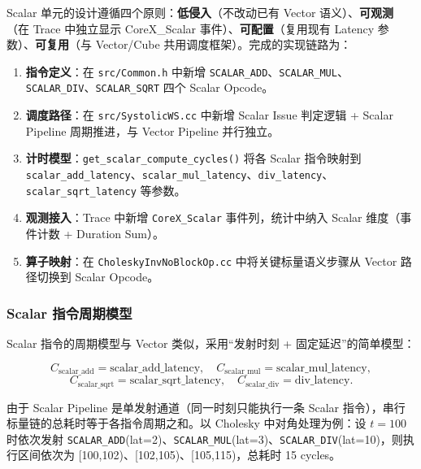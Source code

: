 \documentclass{CjC}
\begin{document}
Scalar 单元的设计遵循四个原则：\textbf{低侵入}（不改动已有 Vector 语义）、\textbf{可观测}（在 Trace 中独立显示 CoreX\_Scalar 事件）、\textbf{可配置}（复用现有 Latency 参数）、\textbf{可复用}（与 Vector/Cube 共用调度框架）。完成的实现链路为：

\begin{enumerate}
    \item \textbf{指令定义}：在 \texttt{src/Common.h} 中新增 \texttt{SCALAR\_ADD}、\texttt{SCALAR\_MUL}、\texttt{SCALAR\_DIV}、\texttt{SCALAR\_SQRT} 四个 Scalar Opcode。
    \item \textbf{调度路径}：在 \texttt{src/SystolicWS.cc} 中新增 Scalar Issue 判定逻辑 + Scalar Pipeline 周期推进，与 Vector Pipeline 并行独立。
    \item \textbf{计时模型}：\texttt{get\_scalar\_compute\_cycles()} 将各 Scalar 指令映射到 \texttt{scalar\_add\_latency}、\texttt{scalar\_mul\_latency}、\texttt{div\_latency}、\texttt{scalar\_sqrt\_latency} 等参数。
    \item \textbf{观测接入}：Trace 中新增 \texttt{CoreX\_Scalar} 事件列，统计中纳入 Scalar 维度（事件计数 + Duration Sum）。
    \item \textbf{算子映射}：在 \texttt{CholeskyInvNoBlockOp.cc} 中将关键标量语义步骤从 Vector 路径切换到 Scalar Opcode。
\end{enumerate}

\subsubsection{Scalar 指令周期模型}

Scalar 指令的周期模型与 Vector 类似，采用“发射时刻 + 固定延迟”的简单模型：

\begin{equation}
C_{\text{scalar\_add}} = \text{scalar\_add\_latency},\quad
C_{\text{scalar\_mul}} = \text{scalar\_mul\_latency},
\end{equation}
\begin{equation}
C_{\text{scalar\_sqrt}} = \text{scalar\_sqrt\_latency},\quad
C_{\text{scalar\_div}} = \text{div\_latency}.
\end{equation}

由于 Scalar Pipeline 是单发射通道（同一时刻只能执行一条 Scalar 指令），串行标量链的总耗时等于各指令周期之和。以 Cholesky 中对角处理为例：设 $t=100$ 时依次发射 \texttt{SCALAR\_ADD}(lat=2)、\texttt{SCALAR\_MUL}(lat=3)、\texttt{SCALAR\_DIV}(lat=10)，则执行区间依次为 [100,102)、[102,105)、[105,115)，总耗时 15 cycles。
\end{document}
